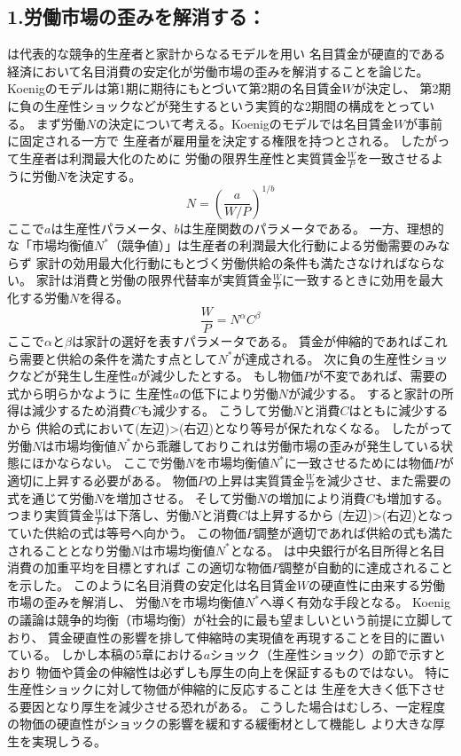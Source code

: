 \subsection{1.労働市場の歪みを解消する：\textcite{Koenig1995}}
\label{sec:review_koenig_1995}
\textcite{Koenig1995}は代表的な競争的生産者と家計からなるモデルを用い
名目賃金が硬直的である経済において名目消費の安定化が労働市場の歪みを解消することを論じた。
Koenigのモデルは第1期に期待にもとづいて第2期の名目賃金\(W\)が決定し、
第2期に負の生産性ショックなどが発生するという実質的な2期間の構成をとっている。
まず労働\(N\)の決定について考える。Koenigのモデルでは名目賃金\(W\)が事前に固定される一方で
生産者が雇用量を決定する権限を持つとされる。
したがって生産者は利潤最大化のために
労働の限界生産性と実質賃金\(\frac{W}{P}\)を一致させるように労働\(N\)を決定する。
\[N=\left(\frac{a}{W/P}\right)^{1/b}\]
ここで\(a\)は生産性パラメータ、\(b\)は生産関数のパラメータである。
一方、理想的な「市場均衡値\(N^*\)（競争値）」は生産者の利潤最大化行動による労働需要のみならず
家計の効用最大化行動にもとづく労働供給の条件も満たさなければならない。
家計は消費と労働の限界代替率が実質賃金\(\frac{W}{P}\)に一致するときに効用を最大化する労働\(N\)を得る。
\[\frac{W}{P}=N^\alpha C^\beta\]
ここで\(\alpha\)と\(\beta\)は家計の選好を表すパラメータである。
賃金が伸縮的であればこれら需要と供給の条件を満たす点として\(N^*\)が達成される。
次に負の生産性ショックなどが発生し生産性\(a\)が減少したとする。
もし物価\(P\)が不変であれば、需要の式から明らかなように
生産性\(a\)の低下により労働\(N\)が減少する。
すると家計の所得は減少するため消費\(C\)も減少する。
こうして労働\(N\)と消費\(C\)はともに減少するから
供給の式において(左辺)>(右辺)となり等号が保たれなくなる。
したがって労働\(N\)は市場均衡値\(N^*\)から乖離しておりこれは労働市場の歪みが発生している状態にほかならない。
ここで労働\(N\)を市場均衡値\(N^*\)に一致させるためには物価\(P\)が適切に上昇する必要がある。
物価\(P\)の上昇は実質賃金\(\frac{W}{P}\)を減少させ、また需要の式を通じて労働\(N\)を増加させる。
そして労働\(N\)の増加により消費\(C\)も増加する。
つまり実質賃金\(\frac{W}{P}\)は下落し、労働\(N\)と消費\(C\)は上昇するから
(左辺)>(右辺)となっていた供給の式は等号へ向かう。
この物価\(P\)調整が適切であれば供給の式も満たされることとなり労働\(N\)は市場均衡値\(N^*\)となる。
\textcite{Koenig1995}は中央銀行が名目所得と名目消費の加重平均を目標とすれば
この適切な物価\(P\)調整が自動的に達成されることを示した。
このように名目消費の安定化は名目賃金\(W\)の硬直性に由来する労働市場の歪みを解消し、
労働\(N\)を市場均衡値\(N^*\)へ導く有効な手段となる。
Koenigの議論は競争的均衡（市場均衡）が社会的に最も望ましいという前提に立脚しており、
賃金硬直性の影響を排して伸縮時の実現値を再現することを目的に置いている。
しかし本稿の5章における\(a\)ショック（生産性ショック）の節で示すとおり
物価や賃金の伸縮性は必ずしも厚生の向上を保証するものではない。
特に生産性ショックに対して物価が伸縮的に反応することは
生産を大きく低下させる要因となり厚生を減少させる恐れがある。
こうした場合はむしろ、一定程度の物価の硬直性がショックの影響を緩和する緩衝材として機能し
より大きな厚生を実現しうる。

